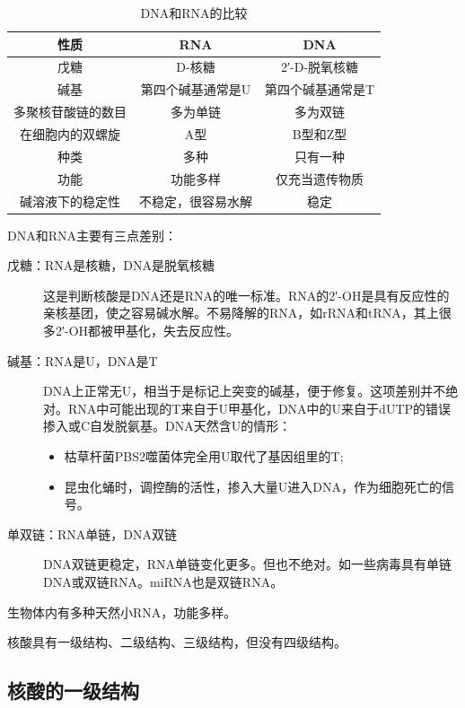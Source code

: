 \begin{table}[htbp]
	\centering
	\begin{tabularx}{\textwidth}{|c|C|C|}
		\hline
		\textbf{性质} & \textbf{RNA} & \textbf{DNA} \\ \hline
		戊糖 & D-核糖 & 2′-D-脱氧核糖 \\ \hline
		碱基 & 第四个碱基通常是U & 第四个碱基通常是T \\ \hline
		多聚核苷酸链的数目 & 多为单链 & 多为双链 \\ \hline
		在细胞内的双螺旋 & A型 & B型和Z型 \\ \hline
		种类 & 多种 & 只有一种 \\ \hline
		功能 & 功能多样 & 仅充当遗传物质 \\ \hline
		碱溶液下的稳定性 & 不稳定，很容易水解 & 稳定 \\ \hline
	\end{tabularx}
	\caption{DNA和RNA的比较}
	\label{tab:DNA_RNA}
\end{table}

DNA和RNA主要有三点差别：
\begin{description}
	\item[戊糖：RNA是核糖，DNA是脱氧核糖] 这是判断核酸是DNA还是RNA的唯一标准。RNA的2′-OH是具有反应性的亲核基团，使之容易碱水解。不易降解的RNA，如rRNA和tRNA，其上很多2′-OH都被甲基化，失去反应性。
	\item[碱基：RNA是U，DNA是T] DNA上正常无U，相当于是标记上突变的碱基，便于修复。这项差别并不绝对。RNA中可能出现的T来自于U甲基化，DNA中的U来自于dUTP的错误掺入或C自发脱氨基。DNA天然含U的情形：
	\begin{itemize}
		\item 枯草杆菌PBS2噬菌体完全用U取代了基因组里的T;
		\item 昆虫化蛹时，调控酶的活性，掺入大量U进入DNA，作为细胞死亡的信号。
	\end{itemize}
	\item[单双链：RNA单链，DNA双链]DNA双链更稳定，RNA单链变化更多。但也不绝对。如一些病毒具有单链DNA或双链RNA。miRNA也是双链RNA。
\end{description}

生物体内有多种天然小RNA，功能多样。

\mbox{}

核酸具有一级结构、二级结构、三级结构，但没有四级结构。

\subsection{核酸的一级结构}

